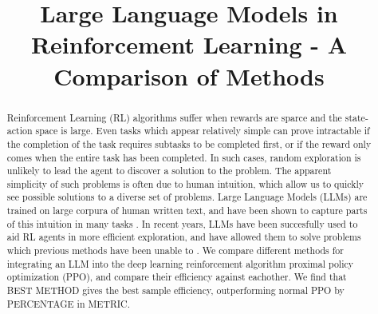 \documentclass[conference]{IEEEtran}
\begin{document}
\title{Large Language Models in Reinforcement Learning - A Comparison of Methods}

\author{
\and
{}
\and
{}
}

\maketitle

\begin{abstract}

Reinforcement Learning (RL) algorithms suffer when rewards are sparce and the state-action space is large. Even tasks which appear relatively simple can prove intractable if the completion of the task requires subtasks to be completed first, or if the reward only comes when the entire task has been completed. In such cases, random exploration is unlikely to lead the agent to discover a solution to the problem. The apparent simplicity of such problems is often due to human intuition, which allow us to quickly see possible solutions to a diverse set of problems. Large Language Models (LLMs) are trained on large corpura of human written text, and have been shown to capture parts of this intuition in many tasks \cite{sparks}. In recent years, LLMs have been succesfully used to aid RL agents in more efficient exploration, and have allowed them to solve problems which previous methods have been unable to \cite{omni} \cite{ellm}. We compare different methods for integrating an LLM into the deep learning reinforcement algorithm proximal policy optimization (PPO), and compare their efficiency against eachother. We find that BEST METHOD gives the best sample efficiency, outperforming normal PPO by PERCENTAGE in METRIC.

\end{abstract}
\end{document}

